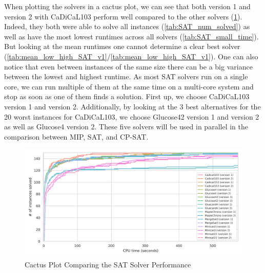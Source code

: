When plotting the solvers in a cactus plot, we can see that both version 1 and version 2 with CaDiCaL103 perform well compared to the other solvers (\cref{fig:cactus_SAT}). Indeed, they both were able to solve all instances (\cref{tab:SAT_num_solved}) as well as have the most lowest runtimes across all solvers (\cref{tab:SAT_small_time}). But looking at the mean runtimes one cannot determine a clear best solver (\cref{tab:mean_low_high_SAT_v1}/\cref{tab:mean_low_high_SAT_v1}). One can also notice that even between instances of the same size there can be a big variance between the lowest and highest runtime. As most SAT solvers run on a single core, we can run multiple of them at the same time on a multi-core system and stop as soon as one of them finds a solution. First up, we choose CaDiCaL103 version 1 and version 2. Additionally, by looking at the 3 best alternatives for the 20 worst instances for CaDiCaL103, we choose Glucose42 version 1 and version 2 as well as Glucose4 version 2. These five solvers will be used in parallel in the comparison between MIP, SAT, and CP-SAT.

\begin{figure}[htbp]
\centering
\includegraphics[scale=0.7]{Thesis/figures/minibenchmark_cactus_plot_runtime_SAT_with_holes.png}
\caption{Cactus Plot Comparing the SAT Solver Performance}
\label{fig:cactus_SAT}
\end{figure}

